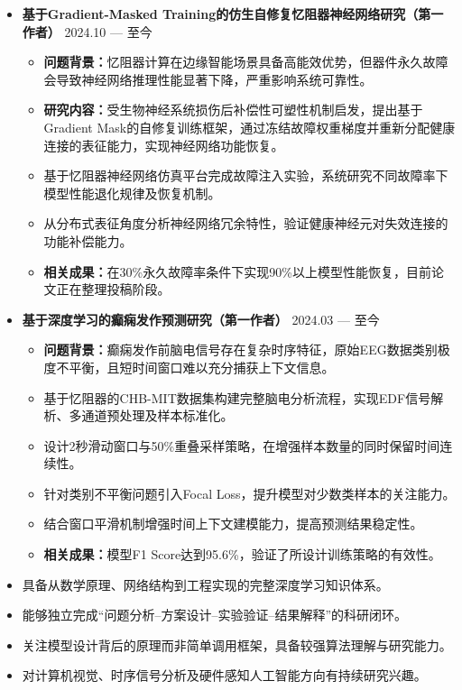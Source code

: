 \documentclass[zh]{resume}
\begin{document}
\begin{itemize}
    \item \textbf{基于Gradient-Masked Training的仿生自修复忆阻器神经网络研究（第一作者）} \hfill 2024.10 --- 至今
    \begin{itemize}
        \item \textbf{问题背景：}忆阻器计算在边缘智能场景具备高能效优势，但器件永久故障会导致神经网络推理性能显著下降，严重影响系统可靠性。
        \item \textbf{研究内容：}受生物神经系统损伤后补偿性可塑性机制启发，提出基于Gradient Mask的自修复训练框架，通过冻结故障权重梯度并重新分配健康连接的表征能力，实现神经网络功能恢复。
        \item 基于忆阻器神经网络仿真平台完成故障注入实验，系统研究不同故障率下模型性能退化规律及恢复机制。
        \item 从分布式表征角度分析神经网络冗余特性，验证健康神经元对失效连接的功能补偿能力。
        \item \textbf{相关成果：}在30\%永久故障率条件下实现90\%以上模型性能恢复，目前论文正在整理投稿阶段。
    \end{itemize}

    \item \textbf{基于深度学习的癫痫发作预测研究（第一作者）} \hfill 2024.03 --- 至今
    \begin{itemize}
        \item \textbf{问题背景：}癫痫发作前脑电信号存在复杂时序特征，原始EEG数据类别极度不平衡，且短时间窗口难以充分捕获上下文信息。
        \item 基于忆阻器的CHB-MIT数据集构建完整脑电分析流程，实现EDF信号解析、多通道预处理及样本标准化。
        \item 设计2秒滑动窗口与50\%重叠采样策略，在增强样本数量的同时保留时间连续性。
        \item 针对类别不平衡问题引入Focal Loss，提升模型对少数类样本的关注能力。
        \item 结合窗口平滑机制增强时间上下文建模能力，提高预测结果稳定性。
        \item \textbf{相关成果：}模型F1 Score达到95.6\%，验证了所设计训练策略的有效性。
    \end{itemize}
\end{itemize}

\begin{itemize}
    \item 具备从数学原理、网络结构到工程实现的完整深度学习知识体系。
    \item 能够独立完成“问题分析--方案设计--实验验证--结果解释”的科研闭环。
    \item 关注模型设计背后的原理而非简单调用框架，具备较强算法理解与研究能力。
    \item 对计算机视觉、时序信号分析及硬件感知人工智能方向有持续研究兴趣。
\end{itemize}
\end{document}
